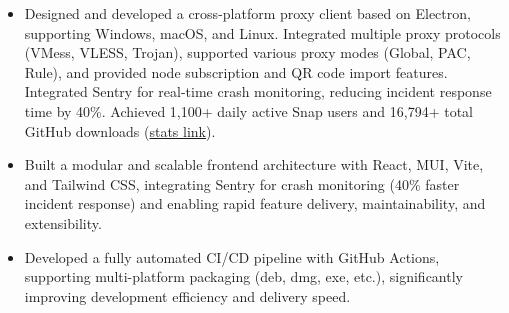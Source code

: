 \documentclass{resume}
\newcommand{\en}[1]{#1}
\newcommand{\zh}[1]{}
\begin{document}
\en{}
\zh{\datedsubsection{\textbf{\href{https://github.com/shaonhuang/V2rayX/tree/v0.4.5}{跨平台代理客户端 – V2rayX（Electron 版本）}}}{}}
\begin{itemize}
    \item \en{Designed and developed a cross-platform proxy client based on Electron, supporting Windows, macOS, and Linux. Integrated multiple proxy protocols (VMess, VLESS, Trojan), supported various proxy modes (Global, PAC, Rule), and provided node subscription and QR code import features. Integrated Sentry for real-time crash monitoring, reducing incident response time by 40\%. Achieved 1,100+ daily active Snap users and 16,794+ total GitHub downloads (\href{https://tooomm.github.io/github-release-stats/?username=shaonhuang&repository=V2rayX}{stats link}).}
          \zh{设计并实现基于 Electron 的跨平台代理客户端，支持 Windows、macOS、Linux，集成多种代理协议（VMess、VLESS、Trojan），支持全局、PAC、规则等多种代理模式，提供节点订阅与二维码识别导入功能。snap 端日常使用人数1100+, github 总下载数 16,794+（\href{https://tooomm.github.io/github-release-stats/?username=shaonhuang&repository=V2rayX}{统计链接}）}
    \item \en{Built a modular and scalable frontend architecture with React, MUI, Vite, and Tailwind CSS, integrating Sentry for crash monitoring (40\% faster incident response) and enabling rapid feature delivery, maintainability, and extensibility.}
          \zh{使用 React、MUI、Vite 和 Tailwind 构建前端架构，模块化设计，便于维护和扩展。集成 Sentry 实现 Crash 监控，错误响应时间缩短 40\%。}
    \item \en{Developed a fully automated CI/CD pipeline with GitHub Actions, supporting multi-platform packaging (deb, dmg, exe, etc.), significantly improving development efficiency and delivery speed.}
          \zh{构建 GitHub Actions CI/CD 流水线，自动构建多平台安装包（deb、dmg、exe、etc），提高开发效率与交付速度。}
\end{itemize}
\end{document}
